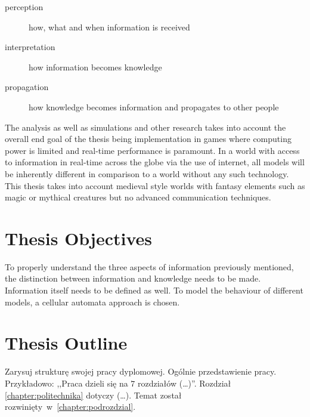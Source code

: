 \begin{description}
    \item[perception] how, what and when information is received
    \item[interpretation] how information becomes knowledge
    \item[propagation] how knowledge becomes information and propagates to other people
\end{description}

The analysis as well as simulations and other research takes into account the overall end goal of the thesis being implementation in games where computing power is limited and real-time performance is paramount.
In a world with access to information in real-time across the globe via the use of internet, all models will be inherently different in comparison to a world without any such technology.
This thesis takes into account medieval style worlds with fantasy elements such as magic or mythical creatures but no advanced communication techniques.

\section{Thesis Objectives}
To properly understand the three aspects of information previously mentioned, the distinction between information and knowledge needs to be made.
Information itself needs to be defined as well.
To model the behaviour of different models, a cellular automata approach is chosen.

\section{Thesis Outline}
Zarysuj strukturę swojej pracy dyplomowej. Ogólnie przedstawienie pracy. Przykładowo: ,,Praca dzieli się na $7$ rozdziałów (\dots)''. Rozdział \ref{chapter:politechnika} dotyczy (\dots). Temat został rozwinięty~w~\ref{chapter:podrozdzial}.